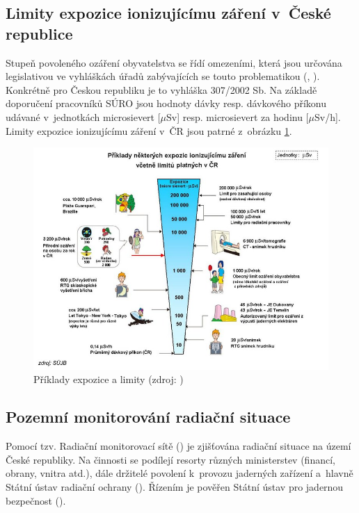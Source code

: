 \subsection{Limity expozice ionizujícímu záření v~České republice}
\label{sub:limity} Stupeň povoleného ozáření obyvatelstva se řídí
omezeními, která jsou určována le\-gislativou ve vyhláškách úřadů
zabývajících se touto problematikou (, ). Konkrétně
pro Českou republiku je to vyhláška 307/2002 Sb. Na základě doporučení
pracovníků SÚRO jsou hodnoty dávky resp. dávkového příkonu udávané
v~jednotkách microsievert [$\mu$Sv] resp. microsievert za hodinu
[$\mu$Sv/h]. Limity expozice ionizujícímu záření v~ČR jsou patrné
z~obrázku \ref{fig:davkyCR}. \cite{suroPriRadOch}

\begin{figure}[H] \centering
    \includegraphics[scale=0.6]{./pictures/davkyCR.jpeg}
      	\caption[Příklady expozice a limity]{Příklady expozice a
limity (zdroj: \cite{suroOcek})}
    	\label{fig:davkyCR}
\end{figure}

\subsection{Pozemní monitorování radiační situace} Pomocí
tzv. Radiační monitorovací sítě () je zjišťována radiační
situace na území České republiky. Na činnosti  se podílejí
resorty různých ministerstev (financí, obrany, vnitra atd.), dále
držitelé povolení k~provozu jaderných zařízení a~hlavně Státní ústav
radiační ochrany (). Řízením je pověřen Státní ústav pro
jadernou bezpečnost (). \cite{suroRMS}

